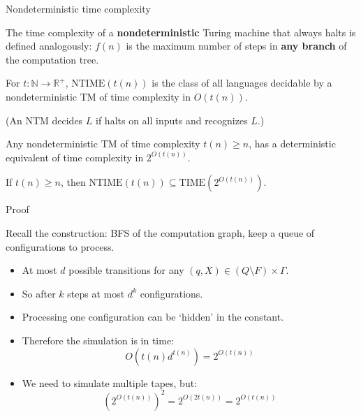 \documentclass[handout]{beamer}
\begin{document}
\begin{frame}{Nondeterministic time complexity}
    
    The \alert{time complexity} of a \textbf{nondeterministic} Turing machine that always halts is defined analogously: $f(n)$ is the maximum number of steps in \textbf{any branch} of the computation tree.
    
    \begin{definition}
        For $t:\mathbb{N}\to \mathbb{R}^+$, \alert{$\mathrm{NTIME}(t(n))$} is the class of all languages decidable by a nondeterministic TM of time complexity in $O(t(n))$.
    \end{definition}
    \vspace{-6pt}
    (An NTM \alert{decides} $L$ if halts on all inputs and recognizes $L$.)

    \smallskip

    \begin{theorem}        
    Any nondeterministic TM of time complexity $t(n)\geq n$, has a deterministic equivalent of time complexity in $2^{O(t(n))}$.
    \end{theorem}

    \begin{corollary}
        If $t(n)\geq n$, then $\mathrm{NTIME}(t(n))\subseteq \mathrm{TIME}(2^{O(t(n))})$.
    \end{corollary}
    
\end{frame}


\begin{frame}{Proof}

    Recall the construction: BFS of the computation graph, keep a queue of configurations to process.
    \begin{itemize}
        \item At most $d$ possible transitions for any $(q,X)\in (Q\setminus F)\times \Gamma$. 
        \item So after $k$ steps at most $d^k$ configurations.
        \item Processing one configuration can be `hidden' in the constant.
        \item Therefore the simulation is in time:
        $$
        O(t(n)d^{t(n)})=2^{O(t(n))}
        $$
        \item We need to simulate multiple tapes, but: 
        $$
        (2^{O(t(n))})^2=2^{O(2t(n))}=2^{O(t(n))}
        $$

        \vspace{-12pt}
        \hfill\qedsymbol
    \end{itemize}

\end{frame}
\end{document}
